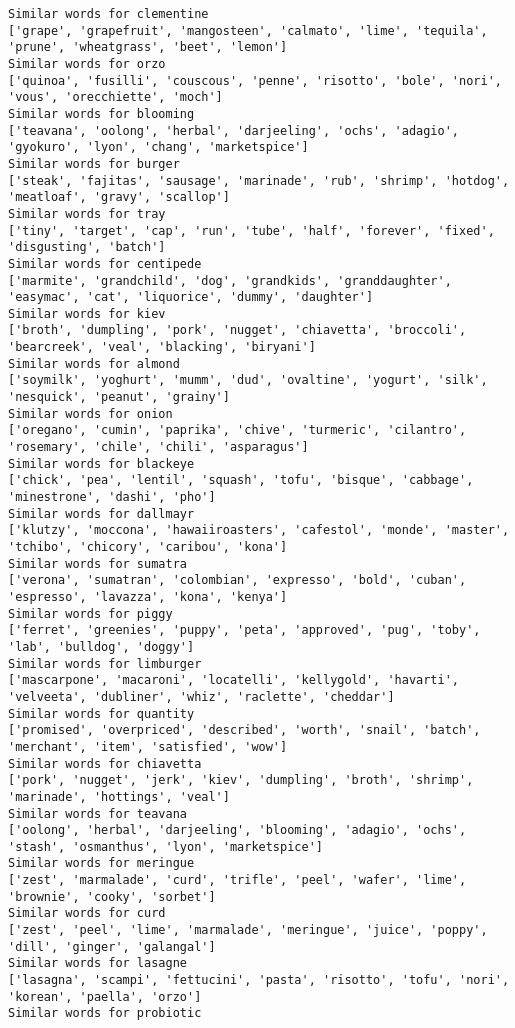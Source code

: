 \documentclass[11pt]{article}
\begin{document}
\begin{Verbatim}[commandchars=\\\{\}]
Similar words for clementine
['grape', 'grapefruit', 'mangosteen', 'calmato', 'lime', 'tequila', 'prune', 'wheatgrass', 'beet', 'lemon']
Similar words for orzo
['quinoa', 'fusilli', 'couscous', 'penne', 'risotto', 'bole', 'nori', 'vous', 'orecchiette', 'moch']
Similar words for blooming
['teavana', 'oolong', 'herbal', 'darjeeling', 'ochs', 'adagio', 'gyokuro', 'lyon', 'chang', 'marketspice']
Similar words for burger
['steak', 'fajitas', 'sausage', 'marinade', 'rub', 'shrimp', 'hotdog', 'meatloaf', 'gravy', 'scallop']
Similar words for tray
['tiny', 'target', 'cap', 'run', 'tube', 'half', 'forever', 'fixed', 'disgusting', 'batch']
Similar words for centipede
['marmite', 'grandchild', 'dog', 'grandkids', 'granddaughter', 'easymac', 'cat', 'liquorice', 'dummy', 'daughter']
Similar words for kiev
['broth', 'dumpling', 'pork', 'nugget', 'chiavetta', 'broccoli', 'bearcreek', 'veal', 'blacking', 'biryani']
Similar words for almond
['soymilk', 'yoghurt', 'mumm', 'dud', 'ovaltine', 'yogurt', 'silk', 'nesquick', 'peanut', 'grainy']
Similar words for onion
['oregano', 'cumin', 'paprika', 'chive', 'turmeric', 'cilantro', 'rosemary', 'chile', 'chili', 'asparagus']
Similar words for blackeye
['chick', 'pea', 'lentil', 'squash', 'tofu', 'bisque', 'cabbage', 'minestrone', 'dashi', 'pho']
Similar words for dallmayr
['klutzy', 'moccona', 'hawaiiroasters', 'cafestol', 'monde', 'master', 'tchibo', 'chicory', 'caribou', 'kona']
Similar words for sumatra
['verona', 'sumatran', 'colombian', 'expresso', 'bold', 'cuban', 'espresso', 'lavazza', 'kona', 'kenya']
Similar words for piggy
['ferret', 'greenies', 'puppy', 'peta', 'approved', 'pug', 'toby', 'lab', 'bulldog', 'doggy']
Similar words for limburger
['mascarpone', 'macaroni', 'locatelli', 'kellygold', 'havarti', 'velveeta', 'dubliner', 'whiz', 'raclette', 'cheddar']
Similar words for quantity
['promised', 'overpriced', 'described', 'worth', 'snail', 'batch', 'merchant', 'item', 'satisfied', 'wow']
Similar words for chiavetta
['pork', 'nugget', 'jerk', 'kiev', 'dumpling', 'broth', 'shrimp', 'marinade', 'hottings', 'veal']
Similar words for teavana
['oolong', 'herbal', 'darjeeling', 'blooming', 'adagio', 'ochs', 'stash', 'osmanthus', 'lyon', 'marketspice']
Similar words for meringue
['zest', 'marmalade', 'curd', 'trifle', 'peel', 'wafer', 'lime', 'brownie', 'cooky', 'sorbet']
Similar words for curd
['zest', 'peel', 'lime', 'marmalade', 'meringue', 'juice', 'poppy', 'dill', 'ginger', 'galangal']
Similar words for lasagne
['lasagna', 'scampi', 'fettucini', 'pasta', 'risotto', 'tofu', 'nori', 'korean', 'paella', 'orzo']
Similar words for probiotic

\end{Verbatim}
\end{document}
